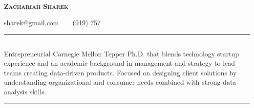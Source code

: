 \documentclass[12pt,letterpaper,oneside]{article}
\makeatletter
\newcommand{\headerrow}[2]
{\begin{tabular*}{\linewidth}{l@{\extracolsep{\fill}}r}
	#1 &
	#2 \\
\end{tabular*}}
\makeatother
\begin{document}
\begin{center}
{\LARGE \textbf{\textsc{Zachariah Sharek}}}
\vspace{0.1em}

	{sharek@gmail.com\ \ \textbullet \ \ (919) 757}	
\end{center}
\vspace{0.5em}

\hrule
\vspace{-1em}
\subsection*{}

\vspace{-0.7em}
Entrepreneurial Carnegie Mellon Tepper Ph.D. that blends technology startup experience and an academic background in management and strategy to lead teams creating data-driven products. Focused on designing client solutions by understanding organizational and consumer needs combined with strong data analysis skills.    
\vspace{1em}
\hrule
\vspace{-0.4em}
\end{document}
